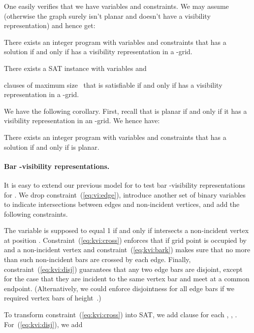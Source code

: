 \documentclass[runningheads]{llncs}
\newcounter{constr}
\begin{document}
One easily verifies that we have  variables and
constraints.  We may assume  (otherwise the graph
surely isn't planar and doesn't have a visibility representation)
and hence get:

\begin{lemma}
There exists an integer program with  variables and
constraints that has a solution if and only if   has a
visibility representation in a -grid.
\end{lemma}
\begin{lemma}
There exists a SAT instance with  variables and
 
clauses of maximum size~ that is satisfiable
if and only if   has a
visibility representation in a -grid.
\end{lemma}
We have the following corollary.  First, recall that  is planar
if and only if it has a visibility representation in an -grid.
We hence have:

\begin{corollary}
There exists an integer program with  variables and
constraints that has a solution if and only if   is planar.
\end{corollary}

\fi


\paragraph{Bar -visibility representations.}
It is easy to extend our previous model for  to test bar
-visibility representations for . We drop
constraint~(\ref{eq:vi:edge}), introduce another set of binary
variables to indicate intersections between edges and non-incident
vertices, and add the following constraints.

\vspace{-2ex}

The variable  is supposed to equal 1 if and only if 
intersects a non-incident vertex at position .
Constraint~(\ref{eq:kvi:cross}) enforces that  if
grid point  is occupied by  and a non-incident vertex and
constraint~(\ref{eq:kvi:bark}) makes sure that no more than  such
non-incident bars are crossed by each edge. Finally,
constraint~(\ref{eq:kvi:disj}) guarantees that any two edge bars are
disjoint, except for the case that they are incident to the same
vertex bar and meet at a common endpoint. (Alternatively, we could
enforce disjointness for all edge bars if we required vertex bars of
height~.)

To transform constraint~(\ref{eq:kvi:cross}) into SAT,
we add clause 
for each , , .
For~(\ref{eq:kvi:disj}), we add
\end{document}
